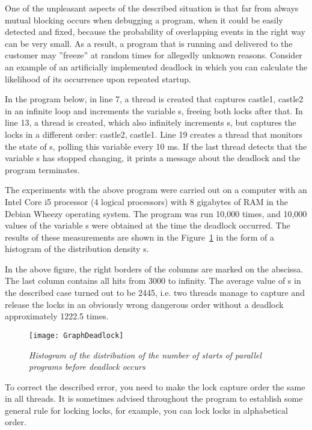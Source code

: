{	\par One of the unpleasant aspects of the described situation is that far from always mutual blocking occurs when debugging a program, when it could be easily detected and fixed, because the probability of overlapping events in the right way can be very small. As a result, a program that is running and delivered to the customer may ''freeze'' at random times for allegedly unknown reasons. Consider an example of an artificially implemented deadlock in which you can calculate the likelihood of its occurrence upon repeated startup.
	\par In the program below, in line 7, a thread is created that captures castle1, castle2 in an infinite loop and increments the variable s, freeing both locks after that. In line 13, a thread is created, which also infinitely increments s, but captures the locks in a different order: castle2, castle1. Line 19 creates a thread that monitors the state of s, polling this variable every 10 ms. If the last thread detects that the variable s has stopped changing, it prints a message about the deadlock and the program terminates.
	\begin{figure}[H]
		
	\end{figure}
	\par The experiments with the above program were carried out on a computer with an Intel Core i5 processor (4 logical processors) with 8 gigabytes of RAM in the Debian Wheezy operating system. The program was run 10,000 times, and 10,000 values of the variable s were obtained at the time the deadlock occurred. The results of these measurements are shown in the Figure~\ref{GraphDeadlock:image} in the form of a histogram of the distribution density s.
	\par In the above figure, the right borders of the columns are marked on the abscissa. The last column contains all hits from 3000 to infinity. The average value of s in the described case turned out to be 2445, i.e. two threads manage to capture and release the locks in an obviously wrong dangerous order without a deadlock approximately 1222.5 times.
	\begin{figure}[H]
		\texttt{[image: GraphDeadlock]}
		\caption{\textit{Histogram of the distribution of the number of starts of parallel programs before deadlock occurs}}
		\label{GraphDeadlock:image}
	\end{figure}
	\par To correct the described error, you need to make the lock capture order the same in all threads. It is sometimes advised throughout the program to establish some general rule for locking locks, for example, you can lock locks in alphabetical order.
}
